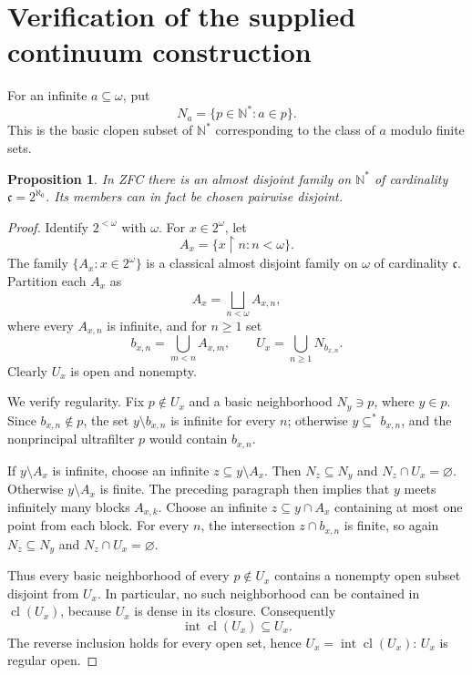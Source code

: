 \documentclass[11pt]{article}
\newtheorem{proposition}[theorem]{Proposition}
\theoremstyle{definition}
\theoremstyle{remark}
\newcommand{\Int}{\operatorname{int}}
\newcommand{\cl}{\operatorname{cl}}
\newcommand{\restr}{\mathbin{\upharpoonright}}
\begin{document}
\section{Verification of the supplied continuum construction}

For an infinite \(a\subseteq\omega\), put
\[
  N_a=\{p\in\mathbb N^*:a\in p\}.
\]
This is the basic clopen subset of \(\mathbb N^*\) corresponding to the class
of \(a\) modulo finite sets.

\begin{proposition}\label{prop:continuum}
In ZFC there is an almost disjoint family on \(\mathbb N^*\) of cardinality
\(\mathfrak c=2^{\aleph_0}\).  Its members can in fact be chosen pairwise
disjoint.
\end{proposition}

\begin{proof}
Identify \(2^{<\omega}\) with \(\omega\).  For \(x\in2^\omega\), let
\[
  A_x=\{x\restr n:n<\omega\}.
\]
The family \(\{A_x:x\in2^\omega\}\) is a classical almost disjoint family on
\(\omega\) of cardinality \(\mathfrak c\).  Partition each \(A_x\) as
\[
  A_x=\bigsqcup_{n<\omega} A_{x,n},
\]
where every \(A_{x,n}\) is infinite, and for \(n\geq1\) set
\[
  b_{x,n}=\bigcup_{m<n}A_{x,m},
  \qquad
  U_x=\bigcup_{n\geq1}N_{b_{x,n}}.
\]
Clearly \(U_x\) is open and nonempty.

We verify regularity.  Fix \(p\notin U_x\) and a basic neighborhood
\(N_y\ni p\), where \(y\in p\).  Since \(b_{x,n}\notin p\), the set
\(y\setminus b_{x,n}\) is infinite for every \(n\); otherwise
\(y\subseteq^*b_{x,n}\), and the nonprincipal ultrafilter \(p\) would contain
\(b_{x,n}\).

If \(y\setminus A_x\) is infinite, choose an infinite
\(z\subseteq y\setminus A_x\).  Then \(N_z\subseteq N_y\) and
\(N_z\cap U_x=\varnothing\).  Otherwise \(y\setminus A_x\) is finite.  The
preceding paragraph then implies that \(y\) meets infinitely many blocks
\(A_{x,k}\).  Choose an infinite \(z\subseteq y\cap A_x\) containing at most
one point from each block.  For every \(n\), the intersection
\(z\cap b_{x,n}\) is finite, so again
\(N_z\subseteq N_y\) and \(N_z\cap U_x=\varnothing\).

Thus every basic neighborhood of every \(p\notin U_x\) contains a nonempty
open subset disjoint from \(U_x\).  In particular, no such neighborhood can
be contained in \(\cl(U_x)\), because \(U_x\) is dense in its closure.
Consequently
\[
  \Int\cl(U_x)\subseteq U_x.
\]
The reverse inclusion holds for every open set, hence
\(U_x=\Int\cl(U_x)\): \(U_x\) is regular open.


\end{proof}
\end{document}

